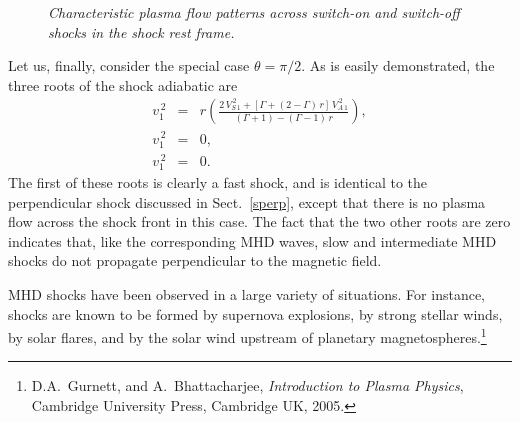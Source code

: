  \begin{figure}
\epsfysize=2.5in
\centerline{}
\caption{\em Characteristic plasma flow patterns across switch-on and switch-off shocks
in the shock rest frame.}\label{f31a}
\end{figure}

Let us, finally, consider the special case $\theta=\pi/2$. As is easily demonstrated, the three roots of the
shock adiabatic are
 \begin{eqnarray}
 v_1^{\,2} &=& r \left(\frac{2\,V_{S\,1}^{\,2} + [\Gamma+(2-\Gamma)\,r]\,V_{A\,1}^{\,2}}
 {(\Gamma+1)-(\Gamma-1)\,r}\right)
 ,\\[0.5ex]
 v_1^{\,2} &=& 0,\\[0.5ex]
 v_1^{\,2} &=& 0.
 \end{eqnarray}
 The first of these roots is clearly  a fast shock, and is  identical to the perpendicular
 shock discussed in Sect.~\ref{sperp}, except that there is no plasma flow across the shock
 front in this case.  The fact that the two other  roots are zero indicates
 that, like the corresponding MHD waves, slow and intermediate MHD shocks do
 not propagate perpendicular to the magnetic field.
 
 MHD shocks have been observed in a large variety of situations. For instance, shocks are
 known to be formed by supernova explosions, by strong stellar winds, by solar flares, and
 by the solar wind upstream of planetary magnetospheres.\footnote{D.A.~Gurnett, and
 A.~Bhattacharjee, {\em Introduction to Plasma
 Physics}, Cambridge University Press, Cambridge UK, 2005.}
 
